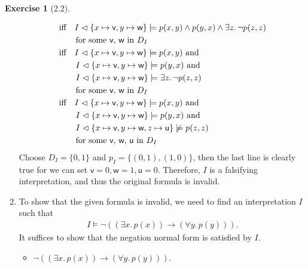 \documentclass[12pt, psamsfonts]{amsart}
\theoremstyle{definition}
\newtheorem*{exer}{Exercise}
\theoremstyle{remark}
\numberwithin{equation}{subsection}
\begin{document}
\begin{exer}[2.2]
\begin{enumerate}[label=(\alph*)]
\begin{align*}
                    &\text{iff}\quad I \vartriangleleft \{ x \mapsto \textsf{v}, y \mapsto \textsf{w} \} \models p(x, y) \land p(y, x) \land \exists z.\, \neg p(z, z) \\
                    &\qquad\text{for some \textsf{v}, \textsf{w} in $D_I$} \\
                    &\text{iff}\quad I \vartriangleleft \{ x \mapsto \textsf{v}, y \mapsto \textsf{w} \} \models p(x, y) \text{ and} \\
                    &\qquad I \vartriangleleft \{ x \mapsto \textsf{v}, y \mapsto \textsf{w} \} \models p(y, x) \text{ and} \\
                    &\qquad I \vartriangleleft \{ x \mapsto \textsf{v}, y \mapsto \textsf{w} \} \models \exists z.\, \neg p(z, z) \\
                    &\qquad\text{for some \textsf{v}, \textsf{w} in $D_I$} \\
                    &\text{iff}\quad I \vartriangleleft \{ x \mapsto \textsf{v}, y \mapsto \textsf{w} \} \models p(x, y) \text{ and} \\
                    &\qquad I \vartriangleleft \{ x \mapsto \textsf{v}, y \mapsto \textsf{w} \} \models p(y, x) \text{ and} \\
                    &\qquad I \vartriangleleft \{ x \mapsto \textsf{v}, y \mapsto \textsf{w}, z \mapsto \textsf{u} \} \not\models p(z, z) \\
                    &\qquad\text{for some \textsf{v}, \textsf{w}, \textsf{u} in $D_I$} \\
            \end{align*}
            Choose $D_I = \{ 0, 1 \}$ and $p_I = \{ (0, 1), (1, 0) \}$, then the last line is clearly true for we can set $\textsf{v} = 0, \textsf{w} = 1, \textsf{u} = 0$.
            Therefore, $I$ is a falsifying interpretation, and thus the original formula is invalid.
        \item %
            To show that the given formula is invalid, we need to find an interpretation $I$ such that
            \begin{align*}
                I \models \neg((\exists x.\, p(x)) \rightarrow (\forall y.\, p(y))).
            \end{align*}
            It suffices to show that the negation normal form is satisfied by $I$.
            \begin{itemize}
                \item
                    $\neg((\exists x.\, p(x)) \rightarrow (\forall y.\, p(y)))$.

\end{itemize}
\end{enumerate}
\end{exer}
\end{document}
